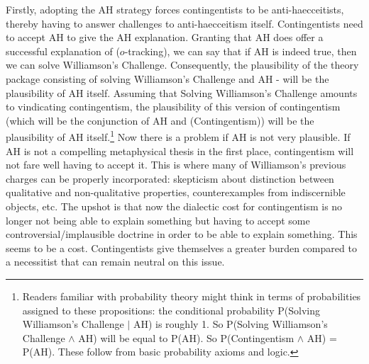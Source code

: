 Firstly, adopting the AH strategy forces contingentists to be anti-haecceitists, thereby having to answer challenges to anti-haecceitism itself. 
Contingentists need to accept AH to give the AH explanation. Granting that AH does offer a successful explanation of ($o$-tracking), we can say that
if AH is indeed true, then we can solve Williamson's Challenge. Consequently, the plausibility of the theory package consisting of solving Williamson's Challenge and AH - will be the plausibility of AH itself. Assuming that Solving Williamson's Challenge amounts to vindicating contingentism, the plausibility of this version of contingentism (which will be the conjunction of AH and (Contingentism)) will be the plausibility of AH itself.\footnote{Readers familiar with probability theory might think in terms of probabilities assigned to these propositions: the conditional probability P(Solving Williamson's Challenge $|$ AH) is roughly 1. So P(Solving Williamson's Challenge $\wedge$ AH) will be equal to P(AH). So  P(Contingentism $\wedge$ AH) = P(AH). These follow from basic probability axioms and logic. }
Now there is a problem if AH is not very plausible. If AH is not a compelling metaphysical thesis in the first place, contingentism will not fare well having to accept it.
This is where many of Williamson's previous charges can be properly incorporated: skepticism about distinction between qualitative and non-qualitative properties, counterexamples from indiscernible objects, etc. The upshot is that now the dialectic cost for contingentism is no longer not being able to explain something but having to accept some controversial/implausible doctrine in order to be able to explain something. This seems to be a cost. Contingentists give themselves a greater burden compared to a necessitist that can remain neutral on this issue. 


